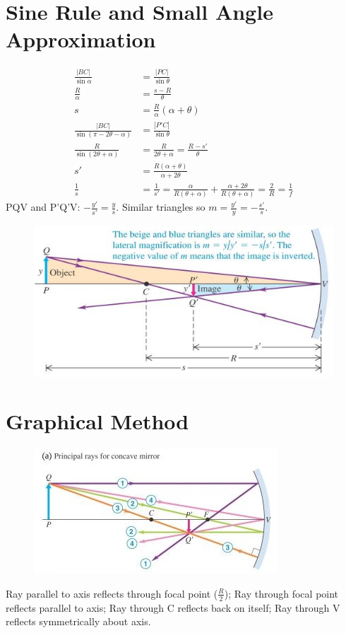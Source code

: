 \documentclass[a4paper, 11pt, normalem]{report}
\begin{document}
\section{Sine Rule and Small Angle Approximation}
\begin{align}
    \frac{|BC|}{\sin{\alpha}} &= \frac{|PC|}{\sin{\theta}} \\
    \frac{R}{\alpha} &= \frac{s - R}{\theta} \\
    s &= \frac{R}{\alpha}(\alpha + \theta) \\
    \frac{|BC|}{\sin{(\pi - 2\theta - \alpha)}} &= \frac{|P'C|}{\sin{\theta}}\\
    \frac{R}{\sin{(2\theta + \alpha)}} &= \frac{R}{2\theta + \alpha} = \frac{R - s'}{\theta} \\
    s' &= \frac{R(\alpha + \theta)}{\alpha + 2\theta} \\
    \frac{1}{s} &= \frac{1}{s'} = \frac{\alpha}{R(\theta + \alpha)} + \frac{\alpha + 2\theta}{R(\theta + \alpha)} = \frac{2}{R} = \frac{1}{f}
\end{align}
PQV and P'Q'V: $-\frac{y'}{s'} = \frac{y}{s}$.
Similar triangles so $m = \frac{y'}{y} = -\frac{s'}{s}$.
\begin{figure}[H]
    \centering
    \includegraphics[scale=0.8]{Reflect1.jpg}
\end{figure}

\section{Graphical Method}
\begin{figure}[H]
    \centering
    \includegraphics{Reflect2.jpg}
\end{figure}
Ray parallel to axis reflects through focal point ($\frac{R}{2}$); Ray through focal point reflects parallel to axis; Ray through C reflects back on itself; Ray through V reflects symmetrically about axis.
\end{document}
